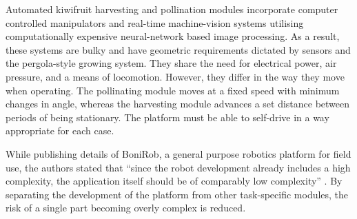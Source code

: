 \documentclass[preprint,authoryear,12pt]{elsarticle}
\begin{document}
    Automated kiwifruit harvesting and pollination modules incorporate computer controlled manipulators and real-time machine-vision systems utilising computationally expensive neural-network based image processing.
    As a result, these systems are bulky and have geometric requirements dictated by sensors and the pergola-style growing system.
    They share the need for electrical power, air pressure, and a means of locomotion.
    However, they differ in the way they move when operating.
    The pollinating module moves at a fixed speed with minimum changes in angle, whereas the harvesting module advances a set distance between periods of being stationary.
    The platform must be able to self-drive in a way appropriate for each case.

    While publishing details of BoniRob, a general purpose robotics platform for field use, the authors stated that ``since the robot development already includes a high complexity, the application itself should be of comparably low complexity'' \citep{Ruckelshausen2009}.
    By separating the development of the platform from other task-specific modules, the risk of a single part becoming overly complex is reduced.
\end{document}
